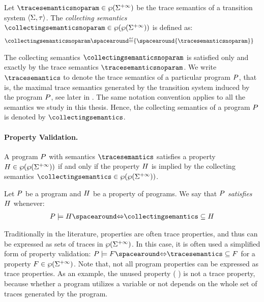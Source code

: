 \begin{definition}
  Let $\tracesemanticsnoparam\in\tracetype$ be the trace semantics of a transition system $\langle \Sigma, \tau \rangle$. The \emph{collecting semantics} $\collectingsemanticsnoparam\in\collectingtype$ is defined as:
  \begin{align*}
    \collectingsemanticsnoparam &\DefeQ \{\spacearound{\tracesemanticsnoparam}\}
  \end{align*}
\end{definition}

The collecting semantics $\collectingsemanticsnoparam$ is satisfied only and exactly by the trace semantics $\tracesemanticsnoparam$.
We write $\tracesemantics$ to denote the trace semantics of a particular program $P$, that is, the maximal trace semantics generated by the transition system induced by the program $P$, see later in .
The same notation convention applies to all the semantics we study in this thesis. Hence, the collecting semantics of a program $P$ is denoted by $\collectingsemantics$.

\paragraph{Property Validation.}

A program $P$ with semantics $\tracesemantics$ satisfies a property $H \in \wp(\wp(\Sigma^{+\infty}))$ if and only if the property $H$ is implied by the collecting semantics $\collectingsemantics\in\collectingtype$.

\newpage
  \begin{definition}
    Let $P$ be a program and $H$ be a property of programs. We say that $P$ \emph{satisfies} $H$ whenever:
    \begin{align*}
      \defprogram \satisfies \defproperty \IfF \collectingsemantics \subseteq \defproperty
    \end{align*}
  \end{definition}


Traditionally in the literature, properties are often trace properties, and thus can be expressed as sets of traces in $\wp(\Sigma^{+\infty})$. In this case, it is often used a simplified form of property validation: $\defprogram \satisfies F \IfF \tracesemantics \subseteq F$ for a property $F \in \wp(\Sigma^{+\infty})$.
Note that, not all program properties can be expressed as trace properties. As an example, the unused property  (\cf{} ) is not a trace property, because whether a program utilizes a variable or not depends on the whole set of traces generated by the program.


